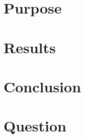 \documentclass[12pt]{article}
\begin{document}

\newpage
\tableofcontents
\newpage
\section{Purpose}
\newpage
\section{Results}
\newpage
\section{Conclusion}
\newpage
\section{Question}
\end{document}
